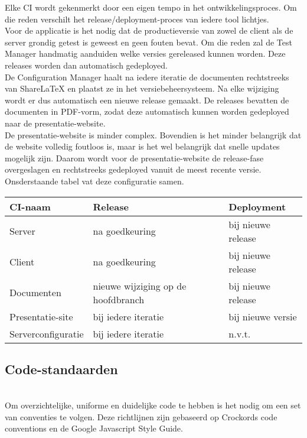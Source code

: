 Elke CI wordt gekenmerkt door een eigen tempo in het ontwikkelingsproces. Om die reden verschilt het release/deployment-proces van iedere tool lichtjes.\\

Voor de applicatie is het nodig dat de productieversie van zowel de client als de server grondig getest is geweest en geen fouten bevat. Om die reden zal de Test Manager handmatig aanduiden welke versies gereleased kunnen worden. Deze releases worden dan automatisch gedeployed.\\

De Configuration Manager haalt na iedere iteratie de documenten rechtstreeks van ShareLaTeX en plaatst ze in het versiebeheersysteem. Na elke wijziging wordt er dus automatisch een nieuwe release gemaakt. De releases bevatten de documenten in PDF-vorm, zodat deze automatisch kunnen worden gedeployed naar de presentatie-website.\\

De presentatie-website is minder complex. Bovendien is het minder belangrijk dat de website volledig foutloos is, maar is het wel belangrijk dat snelle updates mogelijk zijn. Daarom wordt voor de presentatie-website de release-fase overgeslagen en rechtstreeks gedeployed vanuit de meest recente versie.\\

Onsderstaande tabel vat deze configuratie samen.

\begin{tabular}{l|l|l}
CI-naam & Release & Deployment \\
\hline
Server & na goedkeuring & bij nieuwe release \\
Client & na goedkeuring & bij nieuwe release \\
Documenten & nieuwe wijziging op de hoofdbranch & bij nieuwe release \\
Presentatie-site & bij iedere iteratie & bij nieuwe versie \\
Serverconfiguratie & bij iedere iteratie & n.v.t. 
\end{tabular}

\subsection{Code-standaarden} \\

Om overzichtelijke, uniforme en duidelijke code te hebben is het nodig om een set van conventies te volgen. Deze richtlijnen zijn gebaseerd op Crockords code conventions\cite{ccd}
en de Google Javascript Style Guide\cite{gjsg}.

